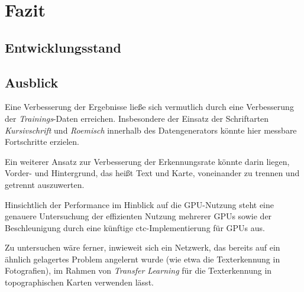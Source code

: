 \section{Fazit}

\subsection{Entwicklungsstand}

\subsection{Ausblick}

Eine Verbesserung der Ergebnisse ließe sich vermutlich durch eine Verbesserung der \textit{Trainings}-Daten erreichen.
Insbesondere der Einsatz der Schriftarten \textit{Kursivschrift} und \textit{Roemisch} innerhalb des Datengenerators
könnte hier messbare Fortschritte erzielen.

Ein weiterer Ansatz zur Verbesserung der Erkennungsrate könnte darin liegen, Vorder- und Hintergrund, das heißt Text
und Karte, voneinander zu trennen und getrennt auszuwerten.

Hinsichtlich der Performance im Hinblick auf die GPU-Nutzung steht eine genauere Untersuchung der effizienten Nutzung
mehrerer GPUs sowie der Beschleunigung durch eine künftige \gls{ctc}-Implementierung für GPUs aus.

Zu untersuchen wäre ferner, inwieweit sich ein Netzwerk, das bereits auf ein ähnlich gelagertes Problem angelernt
wurde (wie etwa die Texterkennung in Fotografien), im Rahmen von \textit{Transfer Learning} für die Texterkennung in
topographischen Karten verwenden lässt.
